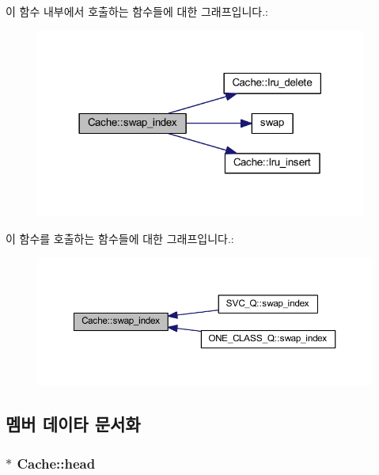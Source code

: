 이 함수 내부에서 호출하는 함수들에 대한 그래프입니다.\+:
\nopagebreak
\begin{figure}[H]
\begin{center}
\leavevmode
\includegraphics[width=309pt]{class_cache_aaff2dc955f9492c044c98a5f09cfddcc_cgraph}
\end{center}
\end{figure}




이 함수를 호출하는 함수들에 대한 그래프입니다.\+:
\nopagebreak
\begin{figure}[H]
\begin{center}
\leavevmode
\includegraphics[width=350pt]{class_cache_aaff2dc955f9492c044c98a5f09cfddcc_icgraph}
\end{center}
\end{figure}




\subsection{멤버 데이타 문서화}
\hypertarget{class_cache_aaf3674e8de1e3896dba64b4caac79f0a}{
\subsubsection[{head}]{$\ast$ Cache\+::head\hspace{0.3cm}{\ttfamily [private]}}}\label{class_cache_aaf3674e8de1e3896dba64b4caac79f0a}


